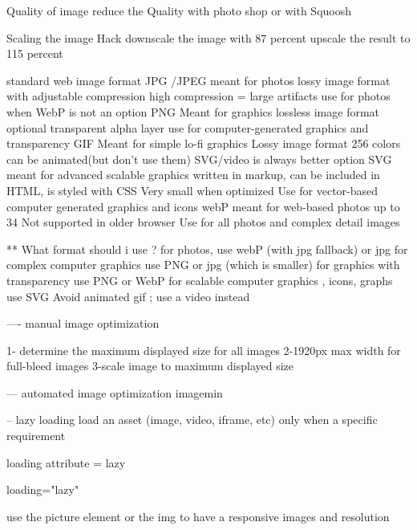Quality of image 
  reduce the Quality with photo shop 
  or with Squoosh 

  Scaling the image Hack 
  downscale the image with 87 percent 
  upscale the result to 115 percent 

  standard web image format 
    JPG /JPEG 
      meant for photos 
      lossy image format with adjustable compression 
      high compression = large artifacts
      use for photos when WebP is not an option 
    PNG
      Meant for graphics 
      lossless image format 
      optional transparent alpha layer 
      use for computer-generated graphics and transparency 
    GIF
      Meant for simple lo-fi graphics 
      Lossy image format 
      256 colors 
      can be animated(but don't use them)
      SVG/video is always better option 
    SVG     
      meant for advanced scalable graphics 
      written in markup, can be included in HTML, is styled with CSS 
      Very small when optimized 
      Use for vector-based computer generated graphics and icons
    webP
      meant for web-based photos 
      up to 34%
      Not supported in older browser 
      Use for all photos and complex detail images 


** 
What format should i use ? 
for photos, use webP (with jpg fallback) or jpg 
for complex computer graphics use PNG or jpg (which is smaller)
for graphics with transparency use PNG or WebP
for scalable computer graphics , icons, graphs use SVG 
Avoid animated gif ; use a video instead 

---- manual image optimization 

1- determine the maximum displayed size for all images 
2-1920px max width for full-bleed images
3-scale image to maximum displayed size 

--- automated image optimization 
  imagemin 


-- lazy loading 
load an asset (image, video, iframe, etc) only when a specific requirement 

loading attribute = lazy   

loading="lazy" 

use the picture element or the img to have a responsive images and resolution 

